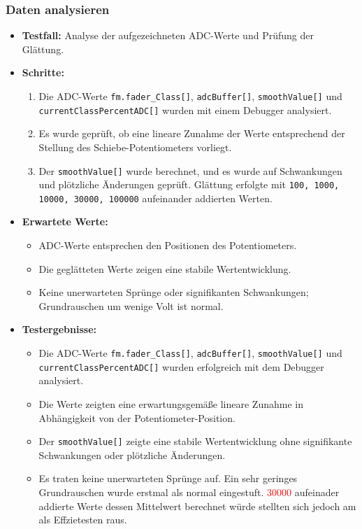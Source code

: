 \subsubsection{Daten analysieren}
\begin{itemize}
    \item \textbf{Testfall:} Analyse der aufgezeichneten ADC-Werte und Prüfung der Glättung.
    \item \textbf{Schritte:}
    \begin{enumerate}
        \item Die ADC-Werte \texttt{fm.fader\_Class[]}, \texttt{adcBuffer[]}, \texttt{smoothValue[]} und \texttt{currentClassPercentADC[]} wurden mit einem Debugger analysiert.
        \item Es wurde geprüft, ob eine lineare Zunahme der Werte entsprechend der Stellung des Schiebe-Potentiometers vorliegt.
        \item Der \texttt{smoothValue[]} wurde berechnet, und es wurde auf Schwankungen und plötzliche Änderungen geprüft. Glättung erfolgte mit \texttt{100, 1000, 10000, 30000, 100000} aufeinander addierten Werten.
    \end{enumerate}
    \item \textbf{Erwartete Werte:} 
    \begin{itemize}
        \item ADC-Werte entsprechen den Positionen des Potentiometers.
        \item Die geglätteten Werte zeigen eine stabile Wertentwicklung.
        \item Keine unerwarteten Sprünge oder signifikanten Schwankungen; Grundrauschen um wenige Volt ist normal.
    \end{itemize}
    \item \textbf{Testergebnisse:}
    \begin{itemize}
        \item Die ADC-Werte \texttt{fm.fader\_Class[]}, \texttt{adcBuffer[]}, \texttt{smoothValue[]} und \texttt{currentClassPercentADC[]} wurden erfolgreich mit dem Debugger analysiert.
        \item Die Werte zeigten eine erwartungsgemäße lineare Zunahme in Abhängigkeit von der Potentiometer-Position.
        \item Der \texttt{smoothValue[]} zeigte eine stabile Wertentwicklung ohne signifikante Schwankungen oder plötzliche Änderungen.
        \item Es traten keine unerwarteten Sprünge auf. Ein sehr geringes Grundrauschen wurde erstmal als normal eingestuft. \textcolor{red}{30000} aufeinader addierte Werte dessen Mittelwert berechnet würde stellten sich jedoch am als Effzietesten raus.
    \end{itemize}
\end{itemize}

